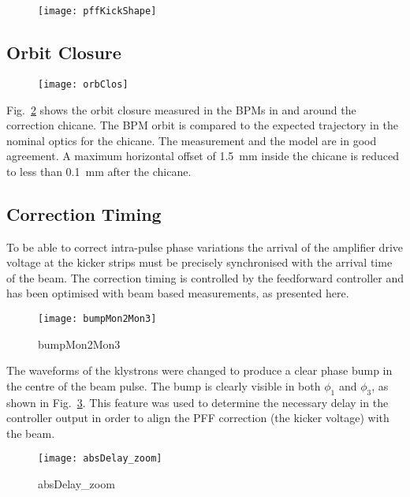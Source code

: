\begin{figure}
 \centering
  \texttt{[image: pffKickShape]} 
  \caption{\label{f:pffKickShape}
  }
\end{figure}

\subsection{\label{ss:orbClos}Orbit Closure}

\begin{figure}
 \centering
  \texttt{[image: orbClos]}%
  \caption{\label{f:orbClos}
  }
\end{figure}

Fig.~\ref{f:orbClos} shows the orbit closure measured in the BPMs in and around 
the correction chicane. The BPM orbit is compared to the expected trajectory in 
the nominal optics for the chicane. The measurement and the model are in good 
agreement. A maximum horizontal offset of 1.5~mm inside the chicane is reduced 
to less than 0.1~mm after the chicane.

\subsection{\label{ss:timing}Correction Timing}

To be able to correct intra-pulse phase variations the arrival of the amplifier 
drive voltage at the kicker strips must be precisely synchronised with the 
arrival time of the beam. The correction timing is controlled by the 
feedforward controller and has been optimised with beam based measurements, as 
presented here.

\begin{figure}
 \centering
  \texttt{[image: bumpMon2Mon3]}%
  \caption{\label{f:bumpMon2Mon3} bumpMon2Mon3
  }
\end{figure}

The waveforms of the klystrons were changed to produce a clear phase bump in 
the 
centre of the beam pulse. The bump is clearly visible in both \(\phi_1\) and 
\(\phi_3\), as shown in Fig.~\ref{f:bumpMon2Mon3}. This feature was used to 
determine the necessary delay in the controller output in order to align the 
PFF correction (the kicker voltage) with the beam. 

\begin{figure}
 \centering
  \texttt{[image: absDelay\_zoom]}%
  \caption{\label{f:absDelay_zoom} absDelay\_zoom
  }
\end{figure}

